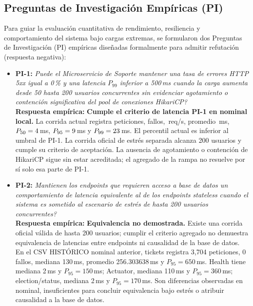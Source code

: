 \documentclass[11pt,a4paper]{article}
\begin{document}
\subsection{Preguntas de Investigaci\'on Emp\'iricas (PI)}
Para guiar la evaluaci\'on cuantitativa de rendimiento, resiliencia y comportamiento del sistema bajo cargas extremas, se formularon dos Preguntas de Investigaci\'on (PI) emp\'iricas dise\~nadas formalmente para admitir refutaci\'on (respuesta negativa):
\begin{itemize}[leftmargin=*]
  \item \textbf{PI-1:} \textit{\textquestiondown Puede el Microservicio de Soporte mantener una tasa de errores HTTP 5xx igual a 0\,\% y una latencia $P_{99}$ inferior a 500\,ms cuando la carga aumenta desde 50 hasta 200 usuarios concurrentes sin evidenciar agotamiento o contenci\'on significativa del pool de conexiones HikariCP?} \\
  \textbf{Respuesta empírica:} \textbf{Cumple el criterio de latencia PI-1 en nominal local.} La corrida actual registra \CargaPeticiones{} peticiones, \CargaFallos{} fallos, \CargaRPS{}\,req/s, promedio \CargaMediaMs{}\,ms, $P_{50}=4$\,ms, $P_{95}=9$\,ms y $P_{99}=23$\,ms. El percentil actual es inferior al umbral de PI-1. La corrida oficial de estrés separada alcanza 200 usuarios y cumple su criterio de aceptación. La ausencia de agotamiento o contención de HikariCP sigue sin estar acreditada; el agregado de la rampa no resuelve por sí solo esa parte de PI-1.
  
  \item \textbf{PI-2:} \textit{\textquestiondown Mantienen los endpoints que requieren acceso a base de datos un comportamiento de latencia equivalente al de los endpoints stateless cuando el sistema es sometido al escenario de estr\'es de hasta 200 usuarios concurrentes?} \\
  \textbf{Respuesta empírica:} \textbf{Equivalencia no demostrada.} Existe una corrida oficial válida de hasta 200 usuarios; cumplir el criterio agregado no demuestra equivalencia de latencias entre endpoints ni causalidad de la base de datos. En el CSV HISTÓRICO nominal anterior, tickets registra 3{,}704 peticiones, 0 fallos, mediana 130\,ms, promedio 256.303638\,ms y $P_{95}=650$\,ms. Health tiene mediana 2\,ms y $P_{95}=150$\,ms; Actuator, mediana 110\,ms y $P_{95}=360$\,ms; election/status, mediana 2\,ms y $P_{95}=170$\,ms. Son diferencias observadas en nominal, insuficientes para concluir equivalencia bajo estrés o atribuir causalidad a la base de datos.
\end{itemize}
\end{document}

